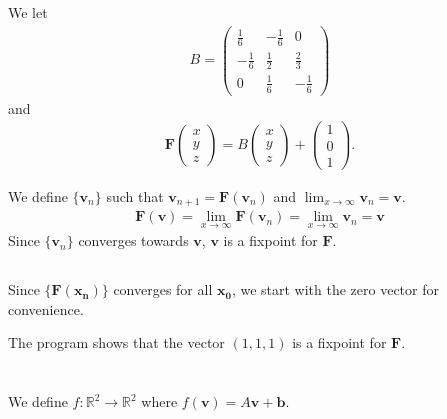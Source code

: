 \documentclass[a4paper,10pt,english]{article}
\begin{document}
We let
\begin{align}
    B = 
    \begin{pmatrix}
        \frac{1}{6} & - \frac{1}{6} & 0 \\
        - \frac{1}{6} & \frac{1}{2} & \frac{2}{3} \\
        0 & \frac{1}{6} & - \frac{1}{6}
    \end{pmatrix}
\end{align}
and
\begin{align}
    \bm{F} \begin{pmatrix}
        x \\ y \\ z
    \end{pmatrix}
    = B
    \begin{pmatrix}
        x \\ y \\ z
    \end{pmatrix}
    + \begin{pmatrix}
        1 \\ 0 \\ 1
    \end{pmatrix}.
\end{align}

We define $\{ \bm{v}_n \}$ such that $\bm{v}_{n+1} = \bm{F}(\bm{v}_n)$ and $\lim_{x \to \infty} \bm{v}_n = \bm{v}$. 
\begin{align*}
    \bm{F}(\bm{v}) = \lim_{x \to \infty} \bm{F}(\bm{v}_n) 
    = \lim_{x \to \infty} \bm{v}_n = \bm{v}
\end{align*}
Since $\{ \bm{v}_n \}$ converges towards $\bm{v}$, $\bm{v}$ is a fixpoint for $\bm{F}$.

\newpage

\subsection{} \label{2c}
Since $\{\bm{F(x_{\text{n}})}\}$ converges for all $\bm{x_0}$, we start with the zero vector for convenience.


The program shows that the vector $(1, 1, 1)$ is a fixpoint for $\bm{F}$.

\newpage

\section{} \label{3}
We define $f: \mathbb{R}^2 \to \mathbb{R}^2$ where $f(\bm{v}) = A \bm{v} + \bm{b}$.
\end{document}
